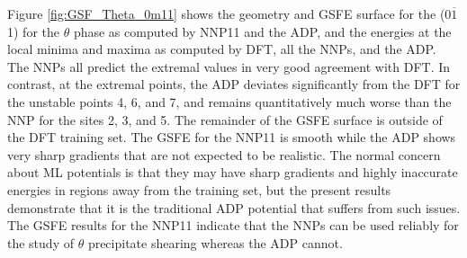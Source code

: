 \documentclass{article}
\begin{document}
Figure \ref{fig:GSF_Theta_0m11} shows the geometry and GSFE surface for the (0$\overline{1}$1) for the $\theta$ phase as computed by NNP11 and the ADP, and the energies at the local minima and maxima as computed by DFT, all the NNPs, and the ADP.  The NNPs all predict the extremal values in very good agreement with DFT.
In contrast, at the extremal points, the ADP deviates significantly from the DFT for the unstable points 4, 6, and 7, and remains quantitatively much worse than the NNP for the sites 2, 3, and 5.  The remainder of the GSFE surface is outside of the DFT training set.  The GSFE for the NNP11 is smooth while the ADP shows very sharp gradients that are not expected to be realistic.  The normal concern about ML potentials is that they may have sharp gradients and highly inaccurate energies in regions away from the training set, but the present results demonstrate that it is the traditional ADP potential that suffers from such issues.  The GSFE results for the NNP11 indicate that the NNPs can be used reliably for the study of $\theta$ precipitate shearing whereas the ADP cannot.
\end{document}

